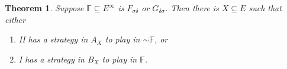 \documentclass[10pt]{amsart}
\newcommand {\F}{\mathbb F}
\newtheorem{thm}{Theorem}[section]
\theoremstyle{definition}
\begin{document}










\begin{thm}\label{gdeltasigma}
Suppose $\F\subseteq E^\infty$ is $F_{\sigma\delta}$ or $G_{\delta\sigma}$. Then there is $X\subseteq E$
such that either
\begin{enumerate}
  \item II has a strategy in $A_X$ to play in $\sim\F$, or
  \item I has a strategy in $B_X$ to play in $\F$.
\end{enumerate}
\end{thm}
\end{document}
